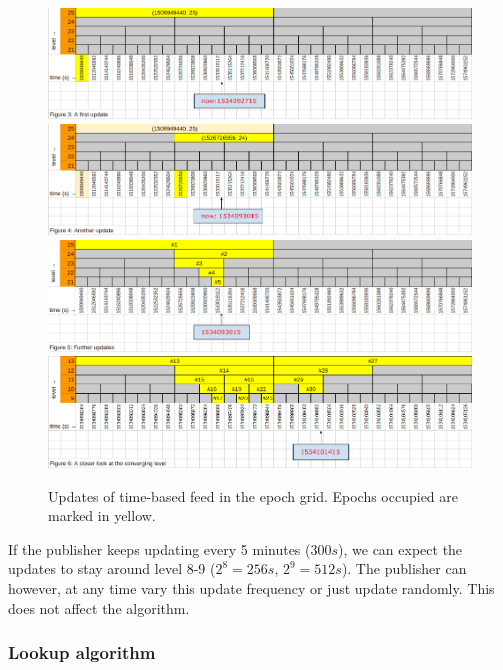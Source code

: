 \begin{figure}[htbp]
\centering
\includegraphics[width=\textwidth]{fig/feeds/00.png}\\
\includegraphics[width=\textwidth]{fig/feeds/01.png}\\
\includegraphics[width=\textwidth]{fig/feeds/02.png}\\
\includegraphics[width=\textwidth]{fig/feeds/03.png}
\caption[Updates of time-based feed in the epoch grid]{Updates of time-based feed in the epoch grid. Epochs occupied are marked in yellow. }
\label{fig:feeds-update}
\end{figure}

If the publisher keeps updating every 5 minutes ($300s$), we can expect the updates to stay around level 8-9 ($2^8 = 256s$, $2^9 = 512s$). The publisher can however, at any time vary this update frequency or just update randomly. This does not affect the algorithm.


\subsubsection{Lookup algorithm}

